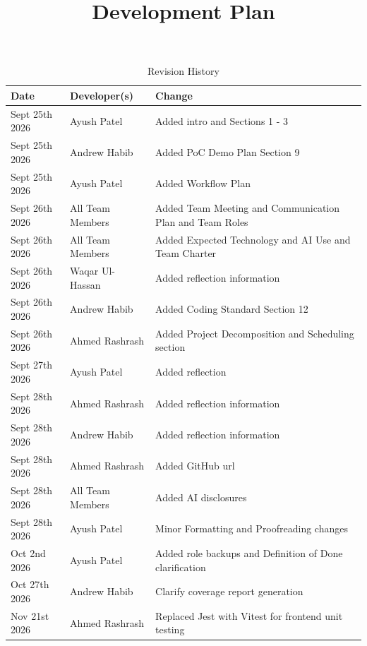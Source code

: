 \documentclass{article}
\title{Development Plan\\\projname}
\author{\authname}
\date{}
\begin{document}
\maketitle

\begin{table}[hp]
    \caption{Revision History} \label{TblRevisionHistory}
    \begin{tabularx}{\textwidth}{llX}
        \toprule
        \textbf{Date}  & \textbf{Developer(s)} & \textbf{Change}                                          \\
        \midrule
        Sept 25th 2026 & Ayush Patel           & Added intro and Sections 1 - 3                           \\
        Sept 25th 2026 & Andrew Habib          & Added PoC Demo Plan Section 9                            \\
        Sept 25th 2026 & Ayush Patel           & Added Workflow Plan                                      \\
        Sept 26th 2026 & All Team Members      & Added Team Meeting and Communication Plan and Team Roles \\
        Sept 26th 2026 & All Team Members      & Added Expected Technology and AI Use and Team Charter    \\
        Sept 26th 2026 & Waqar Ul-Hassan       & Added reflection information                             \\
        Sept 26th 2026 & Andrew Habib          & Added Coding Standard Section 12                         \\
        Sept 26th 2026 & Ahmed Rashrash        & Added Project Decomposition and Scheduling section       \\
        Sept 27th 2026 & Ayush Patel           & Added reflection                                         \\
        Sept 28th 2026 & Ahmed Rashrash        & Added reflection information                             \\
        Sept 28th 2026 & Andrew Habib          & Added reflection information                             \\
        Sept 28th 2026 & Ahmed Rashrash        & Added GitHub url                                         \\
        Sept 28th 2026 & All Team Members      & Added AI disclosures                                     \\
        Sept 28th 2026 & Ayush Patel           & Minor Formatting and Proofreading changes                \\
        Oct 2nd 2026   & Ayush Patel           & Added role backups and Definition of Done clarification  \\
        Oct 27th 2026  & Andrew Habib          & Clarify coverage report generation  \\
        Nov 21st 2026  & Ahmed Rashrash        & Replaced Jest with Vitest for frontend unit testing     \\
        \bottomrule
    \end{tabularx}
\end{table}
\end{document}
